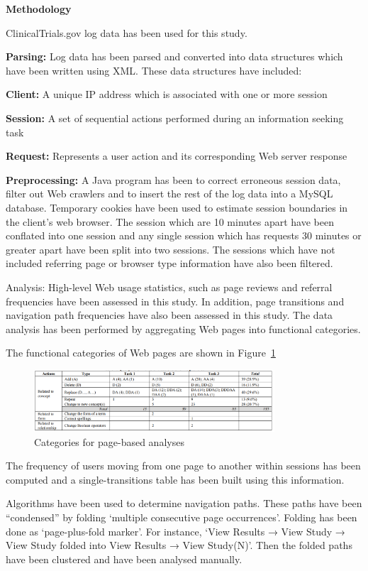 \documentclass[]{article}
\begin{document}
\textbf{Methodology}

ClinicalTrials.gov log data has been used for this study. 

\textbf{Parsing:} Log data has been parsed and converted into data structures which have been written using XML. These data structures have included:

\textbf{Client:} A unique IP address which is associated with one or more session

\textbf{Session:} A set of sequential actions performed during an information seeking task

\textbf{Request:} Represents a user action and its corresponding Web server response 

\textbf{Preprocessing:} A Java program has been to correct erroneous session data, filter out Web crawlers and to insert the rest of the log data into a MySQL database. Temporary cookies have been used to estimate session boundaries in the client’s web browser. The session which are 10 minutes apart have been conflated into one session and any single session which has requests 30 minutes or greater apart have been split into two sessions. The sessions which have not included referring page or browser type information have also been filtered.           

Analysis: High-level Web usage statistics, such as page reviews and referral frequencies have been assessed in this study. In addition, page transitions and navigation path frequencies have also been assessed in this study. The data analysis has been performed by aggregating Web pages into functional categories.  

The functional categories of Web pages are shown in Figure~\ref{fig18}

\begin{figure}[t!]
	\includegraphics[width=0.8\textwidth]{Capture18.png}
	\caption{Categories for page-based analyses \label{fig18}}
\end{figure}

The frequency of users moving from one page to another within sessions has been computed and a single-transitions table has been built using this information. 
 
Algorithms have been used to determine navigation paths. These paths have been “condensed” by folding ‘multiple consecutive page occurrences’. Folding has been done as ‘page-plus-fold marker’. For instance, ‘View Results → View Study → View Study folded into View Results → View Study(N)’. Then the folded paths have been clustered and have been analysed manually.  
  
\end{document}
